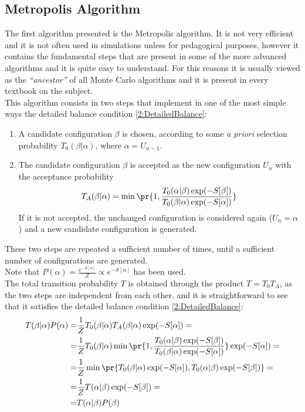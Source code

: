 \subsection{Metropolis Algorithm}
The first algorithm presented is the Metropolis algorithm. It is not very efficient and it is not often used in simulations unless for pedagogical purposes, however it contains the fundamental steps that are present in some of the more advanced algorithms and it is quite easy to understand.
For this reasons it is usually viewed as the \emph{``ancestor''} of all Monte Carlo algorithms and it is present in every textbook on the subject.\\
This algorithm consists in two steps that implement in one of the most simple ways the detailed balance condition \eqref{2:DetailedBalance}:
\begin{enumerate}[label=\arabic*)]
    \item A candidate configuration $\beta$ is chosen, according to some \emph{a priori} selection probability $T_0(\beta|\alpha)$, where $\alpha=U_{n-1}$.
    \item The candidate configuration $\beta$ is accepted as the new configuration $U_n$ with the acceptance probability
          \begin{equation}
              T_A(\beta|\alpha) = \min\pr{1,\frac{T_0(\alpha|\beta)\exp(-S[\beta])}{T_0(\beta|\alpha)\exp(-S[\alpha])}} \label{2:MetropolisAccProb}
          \end{equation}
          If it is not accepted, the unchanged configuration is considered again ($U_n=\alpha$) and a new candidate configuration is generated.
\end{enumerate}
These two steps are repeated a sufficient number of times, until a sufficient number of configurations are generated.\\
Note that $P(\alpha) = \frac{e^{-S[\alpha]}}{Z} \varpropto e^{-S[\alpha]}$ has been used.\\
The total transition probability $T$ is obtained through the product $T=T_0T_A$, as the two steps are independent from each other, and it is straightforward to see that it satisfies the detailed balance condition \eqref{2:DetailedBalance}:
\begin{align*}
    T(\beta|\alpha)P(\alpha) =& \frac1Z T_0(\beta|\alpha)T_A(\beta|\alpha)\exp(-S[\alpha]) = \\
    =& \frac1Z T_0(\beta|\alpha)\min\pr{1,\frac{T_0(\alpha|\beta)\exp(-S[\beta])}{T_0(\beta|\alpha)\exp(-S[\alpha])}}\exp(-S[\alpha]) = \\
    =& \frac1Z \min\pr{T_0(\beta|\alpha)\exp(-S[\alpha]), T_0(\alpha|\beta)\exp(-S[\beta])} = \\
    =& \frac1Z T(\alpha|\beta)\exp(-S[\beta]) = \\
    =& T(\alpha|\beta)P(\beta)
\end{align*}

